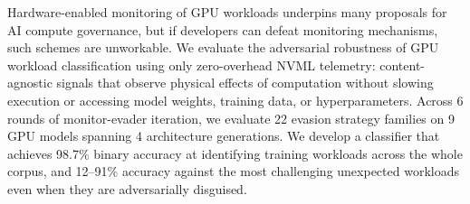 Hardware-enabled monitoring of GPU workloads underpins many proposals for AI compute governance, but if developers can defeat monitoring mechanisms, such schemes are unworkable. We evaluate the adversarial robustness of GPU workload classification using only zero-overhead NVML telemetry: content-agnostic signals that observe physical effects of computation without slowing execution or accessing model weights, training data, or hyperparameters. Across 6 rounds of monitor-evader iteration, we evaluate 22 evasion strategy families on 9 GPU models spanning 4 architecture generations. We develop a classifier that achieves 98.7\% binary accuracy at identifying training workloads across the whole corpus, and 12--91\% accuracy against the most challenging unexpected workloads even when they are adversarially disguised.
